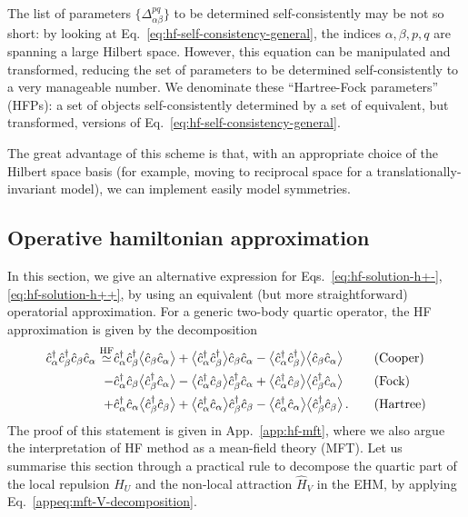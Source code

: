 The list of parameters $\lbrace \Delta_{\alpha\beta}^{pq} \rbrace$ to be determined self-consistently may be not so short: by looking at Eq.~\eqref{eq:hf-self-consistency-general}, the indices $\alpha,\beta,p,q$ are spanning a large Hilbert space. However, this equation can be manipulated and transformed, reducing the set of parameters to be determined self-consistently to a very manageable number. We denominate these ``Hartree-Fock parameters'' (HFPs): a set of objects self-consistently determined by a set of equivalent, but transformed, versions of Eq.~\eqref{eq:hf-self-consistency-general}.

The great advantage of this scheme is that, with an appropriate choice of the Hilbert space basis (for example, moving to reciprocal space for a translationally-invariant model), we can implement easily model symmetries.

\subsection{Operative hamiltonian approximation}

In this section, we give an alternative expression for Eqs.~\eqref{eq:hf-solution-h+-}, \eqref{eq:hf-solution-h++}, by using an equivalent (but more straightforward) operatorial approximation. For a generic two-body quartic operator, the HF approximation is given by the decomposition
\[
\begin{aligned}
	\hat c_\alpha^\dagger \hat c_\beta^\dagger \hat c_\beta \hat c_\alpha \stackrel{\mathrm{HF}}{\simeq} &\hat c_\alpha^\dagger \hat c_\beta^\dagger \big\langle \hat c_\beta \hat c_\alpha \big\rangle + \big\langle \hat c_\alpha^\dagger \hat c_\beta^\dagger \big\rangle \hat c_\beta \hat c_\alpha - \big\langle \hat c_\alpha^\dagger \hat c_\beta^\dagger \big\rangle \big\langle \hat c_\beta \hat c_\alpha \big\rangle \quad&&(\text{Cooper})\\
	- &\hat c_\alpha^\dagger \hat c_\beta \big\langle \hat c_\beta^\dagger \hat c_\alpha \big\rangle - \big\langle \hat c_\alpha^\dagger \hat c_\beta \big\rangle \hat c_\beta^\dagger \hat c_\alpha + \big\langle \hat c_\alpha^\dagger \hat c_\beta \big\rangle \big\langle \hat c_\beta^\dagger \hat c_\alpha \big\rangle \quad&&(\text{Fock})\\
	+ &\hat c_\alpha^\dagger \hat c_\alpha \big\langle \hat c_\beta^\dagger \hat c_\beta \big\rangle + \big\langle \hat c_\alpha^\dagger \hat c_\alpha \big\rangle \hat c_\beta^\dagger \hat c_\beta - \big\langle \hat c_\alpha^\dagger \hat c_\alpha \big\rangle \big\langle \hat c_\beta^\dagger \hat c_\beta \big\rangle \, . \quad&&(\text{Hartree})
\end{aligned}
\]
The proof of this statement is given in App.~\ref{app:hf-mft}, where we also argue the interpretation of HF method as a mean-field theory (MFT). Let us summarise this section through a practical rule to decompose the quartic part of the local repulsion $\hat H_U$ and the non-local attraction $\hat H_V$ in the EHM, by applying Eq.~\eqref{appeq:mft-V-decomposition}.

